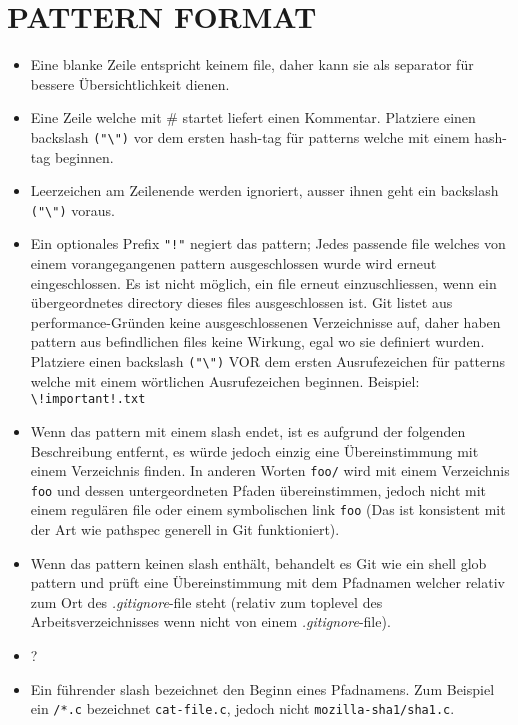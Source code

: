 \section*{PATTERN FORMAT}
\begin{itemize}
\item Eine blanke Zeile entspricht keinem file, daher kann sie als separator für bessere Übersichtlichkeit dienen.
\item Eine Zeile welche mit \# startet liefert einen Kommentar. Platziere einen backslash \verb|("\")| vor dem ersten hash-tag für patterns welche mit einem hash-tag beginnen.
\item Leerzeichen am Zeilenende werden ignoriert, ausser ihnen geht ein backslash \verb|("\")| voraus.
\item Ein optionales Prefix \verb|"!"| negiert das pattern; Jedes passende file welches von einem vorangegangenen pattern ausgeschlossen wurde wird erneut eingeschlossen. Es ist nicht möglich, ein file erneut einzuschliessen, wenn ein übergeordnetes directory dieses files ausgeschlossen ist. Git listet aus performance-Gründen keine ausgeschlossenen Verzeichnisse auf, daher haben pattern aus befindlichen files keine Wirkung, egal wo sie definiert wurden. Platziere einen backslash \verb|("\")| VOR dem ersten Ausrufezeichen für patterns welche mit einem wörtlichen Ausrufezeichen beginnen. Beispiel: \verb|\!important!.txt|
\item Wenn das pattern mit einem slash endet, ist es aufgrund der folgenden Beschreibung entfernt, es würde jedoch einzig eine Übereinstimmung mit einem Verzeichnis finden. In anderen Worten \verb|foo/| wird mit einem Verzeichnis \verb|foo| und dessen untergeordneten Pfaden übereinstimmen, jedoch nicht mit einem regulären file oder einem symbolischen link \verb|foo| (Das ist konsistent mit der Art wie pathspec generell in Git funktioniert).
\item Wenn das pattern keinen slash enthält, behandelt es Git wie ein shell glob pattern und prüft eine Übereinstimmung mit dem Pfadnamen welcher relativ zum Ort des \textit{.gitignore}-file steht (relativ zum toplevel des Arbeitsverzeichnisses wenn nicht von einem \textit{.gitignore}-file).
\item ?
\item Ein führender slash bezeichnet den Beginn eines Pfadnamens. Zum Beispiel ein \verb|/*.c| bezeichnet \verb|cat-file.c|, jedoch nicht \verb|mozilla-sha1/sha1.c|.
\end{itemize}

